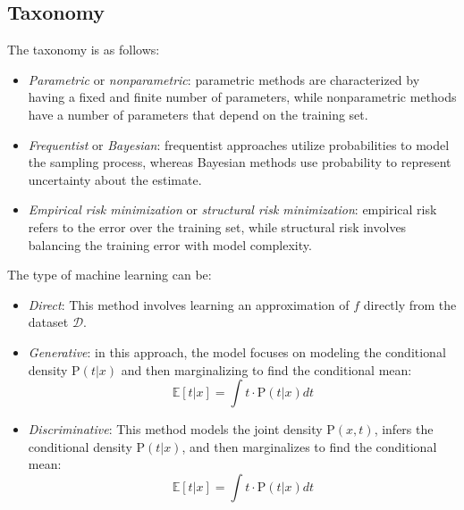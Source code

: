 \subsection{Taxonomy}
The taxonomy is as follows: 
\begin{itemize}
    \item \textit{Parametric} or \textit{nonparametric}: parametric methods are characterized by having a fixed and finite number of parameters, while nonparametric methods have a number of parameters that depend on the training set.
    \item \textit{Frequentist} or \textit{Bayesian}: frequentist approaches utilize probabilities to model the sampling process, whereas Bayesian methods use probability to represent uncertainty about the estimate.
    \item \textit{Empirical risk minimization} or \textit{structural risk minimization}: empirical risk refers to the error over the training set, while structural risk involves balancing the training error with model complexity.
\end{itemize}
The type of machine learning can be: 
\begin{itemize}
    \item \textit{Direct}: This method involves learning an approximation of $f$ directly from the dataset $\mathcal{D}$.
    \item \textit{Generative}: in this approach, the model focuses on modeling the conditional density $\text{P}(t | x)$ and then marginalizing to find the conditional mean:
        \[\mathbb{E} \left[ t | x \right] = \int t \cdot \text{P}(t | x) dt\]
    \item \textit{Discriminative}: This method models the joint density $\text{P}(x,t)$, infers the conditional density $\text{P}(t | x)$, and then marginalizes to find the conditional mean:
        \[\mathbb{E} \left[ t | x \right] = \int t \cdot \text{P}(t | x) dt\]
\end{itemize}
